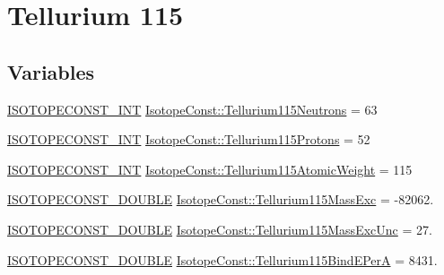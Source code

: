 \hypertarget{group___isotope_const-_tellurium-_te115}{}\section{Tellurium 115}
\label{group___isotope_const-_tellurium-_te115}
\subsection*{Variables}
\begin{DoxyCompactItemize}
\item 
\mbox{\hyperlink{group___isotope_const-_macros_ga5f18360b3e99483a35c32d789e62621c}{I\+S\+O\+T\+O\+P\+E\+C\+O\+N\+S\+T\+\_\+\+I\+NT}} \mbox{\hyperlink{group___isotope_const-_tellurium-_te115_ga292000bc8d2d47d8b9a057eee1d80890}{Isotope\+Const\+::\+Tellurium115\+Neutrons}} = 63
\item 
\mbox{\hyperlink{group___isotope_const-_macros_ga5f18360b3e99483a35c32d789e62621c}{I\+S\+O\+T\+O\+P\+E\+C\+O\+N\+S\+T\+\_\+\+I\+NT}} \mbox{\hyperlink{group___isotope_const-_tellurium-_te115_gaafb60d8a9b8c8210e38ec4c1809bca9d}{Isotope\+Const\+::\+Tellurium115\+Protons}} = 52
\item 
\mbox{\hyperlink{group___isotope_const-_macros_ga5f18360b3e99483a35c32d789e62621c}{I\+S\+O\+T\+O\+P\+E\+C\+O\+N\+S\+T\+\_\+\+I\+NT}} \mbox{\hyperlink{group___isotope_const-_tellurium-_te115_ga1e8662c51d01cd03b259410f49d55a4a}{Isotope\+Const\+::\+Tellurium115\+Atomic\+Weight}} = 115
\item 
\mbox{\hyperlink{group___isotope_const-_macros_ga8f45a7272ce02c0b4c65c44636ed719a}{I\+S\+O\+T\+O\+P\+E\+C\+O\+N\+S\+T\+\_\+\+D\+O\+U\+B\+LE}} \mbox{\hyperlink{group___isotope_const-_tellurium-_te115_ga1131daf64cdb74ddb17e3586bb884c6e}{Isotope\+Const\+::\+Tellurium115\+Mass\+Exc}} = -\/82062.
\item 
\mbox{\hyperlink{group___isotope_const-_macros_ga8f45a7272ce02c0b4c65c44636ed719a}{I\+S\+O\+T\+O\+P\+E\+C\+O\+N\+S\+T\+\_\+\+D\+O\+U\+B\+LE}} \mbox{\hyperlink{group___isotope_const-_tellurium-_te115_gaf9c202472b2cb9b1fd03ea7a36ea6cd7}{Isotope\+Const\+::\+Tellurium115\+Mass\+Exc\+Unc}} = 27.
\item 
\mbox{\hyperlink{group___isotope_const-_macros_ga8f45a7272ce02c0b4c65c44636ed719a}{I\+S\+O\+T\+O\+P\+E\+C\+O\+N\+S\+T\+\_\+\+D\+O\+U\+B\+LE}} \mbox{\hyperlink{group___isotope_const-_tellurium-_te115_ga2ca23ef102b429b0e97619421fb9b400}{Isotope\+Const\+::\+Tellurium115\+Bind\+E\+PerA}} = 8431.
\item 

\end{DoxyCompactItemize}
